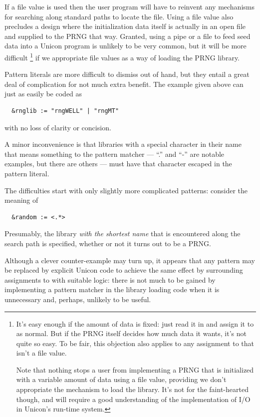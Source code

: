 \documentclass[letterpaper,12pt]{article}
\begin{document}
If a file value is used then the user program will have to reinvent any
mechanisms for searching along standard paths to locate the file. Using a
file value also precludes a design where the initialization data itself is
actually in an open file and supplied to the PRNG that way. Granted, using
a pipe or a file to feed seed data into a Unicon program is unlikely to be
very common, but it will be more difficult%
\footnote{
  It's easy enough if the amount of data is fixed: just read it in and
  assign it to \texttt{\rndkwd} as normal. But if the PRNG itself decides
  how much data it wants, it's not quite so easy. To be fair, this
  objection also applies to any assignment to \texttt{\rndkwd}that isn't a
  file value.

  Note that nothing stops a user from implementing a PRNG that is
  initialized with a variable amount of data using a file value, providing
  we don't appropriate the mechanism to load the library. It's not for the
  faint-hearted though, and will require a good understanding of the
  implementation of I/O in Unicon's run-time system.
}
if we appropriate file values as a way of loading the PRNG library.

Pattern literals are more difficult to dismiss out of hand, but they entail
a great deal of complication for not much extra benefit. The example given
above can just as easily be coded as
\begin{verbatim}
  &rnglib := "rngWELL" | "rngMT"
\end{verbatim}
with no loss of clarity or concision.

A minor inconvenience is that libraries with a special character in their
name that means something to the pattern matcher --- ``.'' and ``-'' are
notable examples, but there are others --- must have that character escaped
in the pattern literal.

The difficulties start with only slightly more complicated patterns:
consider the meaning of
\begin{verbatim}
  &random := <.*>
\end{verbatim}
Presumably, the library {\em with the shortest name} that is encountered along
the search path is specified, whether or not it turns out to be a PRNG.

Although a clever counter-example may turn up, it appears that any pattern
may be replaced by explicit Unicon code to achieve the same effect by
surrounding assignments to \rndlibkwd with suitable logic: there is not
much to be gained by implementing a pattern matcher in the library
loading code when it is unnecessary and, perhaps, unlikely to be useful.
\end{document}
